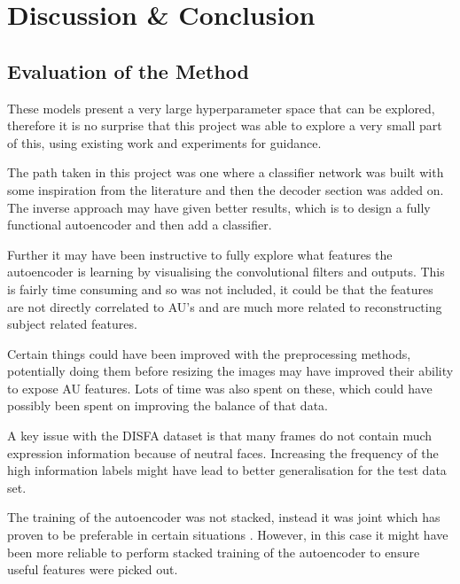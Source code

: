\chapter{Discussion \& Conclusion}

  \section{Evaluation of the Method}
    These models present a very large hyperparameter space that can be
    explored, therefore it is no surprise that this project was able to explore
    a very small part of this, using existing work and experiments for guidance.

    The path taken in this project was one where a classifier network was built
    with some inspiration from the literature and then the decoder section was
    added on. The inverse approach may have given better results, which is to
    design a fully functional autoencoder and then add a classifier.

    Further it may have been instructive to fully explore what features the
    autoencoder is learning by visualising the convolutional filters and
    outputs. This is fairly time consuming and so was not included, it could be
    that the features are not directly correlated to AU's and are much more
    related to reconstructing subject related features.


    Certain things could have been improved with the preprocessing methods,
    potentially doing them before resizing the images may have improved their
    ability to expose AU features. Lots of time was also spent on these, which
    could have possibly been spent on improving the balance of that data.

    A key issue with the DISFA dataset is that many frames do not contain much
    expression information because of neutral faces. Increasing the frequency of
    the high information labels might have lead to better generalisation for the
    test data set.

    The training of the autoencoder was not stacked, instead it was joint which
    has proven to be preferable in certain situations \cite{Zhou2014}. However,
    in this case it might have been more reliable to perform stacked training of
    the autoencoder to ensure useful features were picked out.

